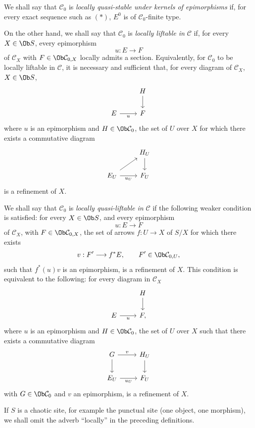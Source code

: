 We shall say that \(\mathcal C_0\) is \emph{locally quasi-stable under kernels of epimorphisms} if, for every exact sequence such as \((*)\), \(E^0\) is of \(\mathcal C_0\)-finite type.

On the other hand, we shall say that \(\mathcal C_0\) is \emph{locally liftable in} \(\mathcal C\) if, for every \(X\in\Ob S\), every epimorphism
\[
  u:E\longrightarrow F
\]
of \(\mathcal C_X\) with \(F\in\Ob\mathcal C_{0,X}\) locally admits a section. Equivalently, for \(\mathcal C_0\) to be locally liftable in \(\mathcal C\), it is necessary and sufficient that, for every diagram of \(\mathcal C_X\), \(X\in\Ob S\),
\[
\begin{tikzcd}
& H \arrow[d]\\
E \arrow[r,"u"'] & F
\end{tikzcd}
\]
where \(u\) is an epimorphism and \(H\in\Ob\mathcal C_0\), the set of \(U\) over \(X\) for which there exists a commutative diagram
\[
\begin{tikzcd}
& H_U \arrow[d]\\
E_U \arrow[r,"u_U"'] \arrow[ur] & F_U
\end{tikzcd}
\]
is a refinement of \(X\).

We shall say that \(\mathcal C_0\) is \emph{locally quasi-liftable in} \(\mathcal C\) if the following weaker condition is satisfied: for every \(X\in\Ob S\), and every epimorphism
\[
  u:E\longrightarrow F
\]
of \(\mathcal C_X\), with \(F\in\Ob\mathcal C_{0,X}\), the set of arrows \(f:U\to X\) of \(S/X\) for which there exists
\[
  v:F'\longrightarrow f^*E,\qquad F'\in\Ob\mathcal C_{0,U},
\]
such that \(f^*(u)v\) is an epimorphism, is a refinement of \(X\). This condition is equivalent to the following: for every diagram in \(\mathcal C_X\)
\[
\begin{tikzcd}
& H \arrow[d]\\
E \arrow[r,"u"'] & F ,
\end{tikzcd}
\]
where \(u\) is an epimorphism and \(H\in\Ob\mathcal C_0\), the set of \(U\) over \(X\) such that there exists a commutative diagram
\[
\begin{tikzcd}
G \arrow[r,"v"] \arrow[d] & H_U \arrow[d]\\
E_U \arrow[r,"u_U"'] & F_U
\end{tikzcd}
\]
with \(G\in\Ob\mathcal C_0\) and \(v\) an epimorphism, is a refinement of \(X\).

If \(S\) is a chaotic site, for example the punctual site (one object, one morphism), we shall omit the adverb ``locally'' in the preceding definitions.

